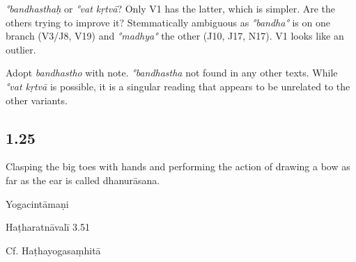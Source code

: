 \begin{ekdosis}
\begin{testimonia}[hp01_024]
\end{testimonia}

\begin{philcomm}[hp01_024]
\emph{°bandhasthaḥ} or \emph{°vat kṛtvā}? Only V1 has the latter, which is simpler. Are the others trying to improve it? Stemmatically ambiguous as \emph{°bandha°} is on one branch (V3/J8, V19) and \emph{°madhya°} the other (J10, J17, N17). V1 looks like an outlier.

Adopt \emph{bandhastho} with note. \emph{°bandhastha} not found in any other texts. While \emph{°vat kṛtvā} is possible, it is a singular reading that appears to be unrelated to the other variants.
\end{philcomm}

\subsection*{1.25}
\begin{translation}[hp01_025]
Clasping the big toes with hands and performing the action of drawing a bow as far as the ear is called dhanurāsana.
\end{translation}

\begin{testimonia}[hp01_025]
Yogacintāmaṇi

\begin{versinnote}
\end{versinnote}

Haṭharatnāvalī 3.51

\begin{versinnote}
\end{versinnote}

Cf. Haṭhayogasaṃhitā

\begin{versinnote}
\end{versinnote}


\end{testimonia}
\end{ekdosis}
